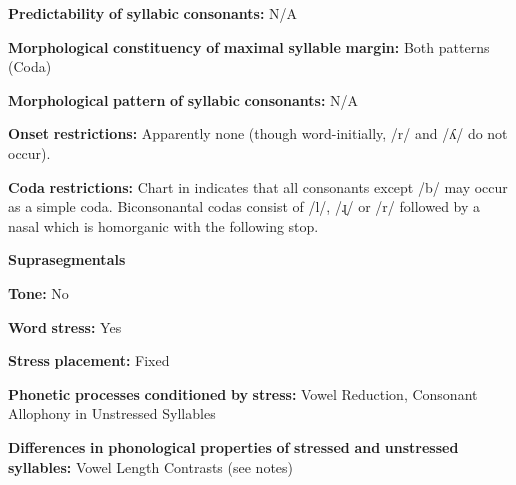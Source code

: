 \documentclass[output=paper]{langsci/langscibook}
\begin{document}
\begin{styleBody}
\textbf{Predictability} \textbf{of} \textbf{syllabic} \textbf{consonants:} N/A
\end{styleBody}

\begin{styleBody}
\textbf{Morphological} \textbf{constituency} \textbf{of} \textbf{maximal} \textbf{syllable} \textbf{margin:} Both patterns (Coda)
\end{styleBody}

\begin{styleBody}
\textbf{Morphological} \textbf{pattern} \textbf{of} \textbf{syllabic} \textbf{consonants:} N/A
\end{styleBody}

\begin{styleBody}
\textbf{Onset} \textbf{restrictions:} Apparently none (though word-initially, /r/ and /ʎ/ do not occur).
\end{styleBody}

\begin{styleBody}
\textbf{Coda} \textbf{restrictions:} Chart in \citet[102]{Bowern2012} indicates that all consonants except /b/ may occur as a simple coda. Biconsonantal codas consist of /l/, /ɻ/ or /r/ followed by a nasal which is homorganic with the following stop.
\end{styleBody}

\begin{styleBody}
\textbf{Suprasegmentals}
\end{styleBody}

\begin{styleBody}
\textbf{Tone:} No
\end{styleBody}

\begin{styleBody}
\textbf{Word} \textbf{stress:} Yes
\end{styleBody}

\begin{styleBody}
\textbf{Stress} \textbf{placement:} Fixed
\end{styleBody}

\begin{styleBody}
\textbf{Phonetic} \textbf{processes} \textbf{conditioned} \textbf{by} \textbf{stress:} Vowel Reduction, Consonant Allophony in Unstressed Syllables
\end{styleBody}

\begin{styleBody}
\textbf{Differences} \textbf{in} \textbf{phonological} \textbf{properties} \textbf{of} \textbf{stressed} \textbf{and} \textbf{unstressed} \textbf{syllables:} Vowel Length Contrasts (see notes)
\end{styleBody}
\end{document}
